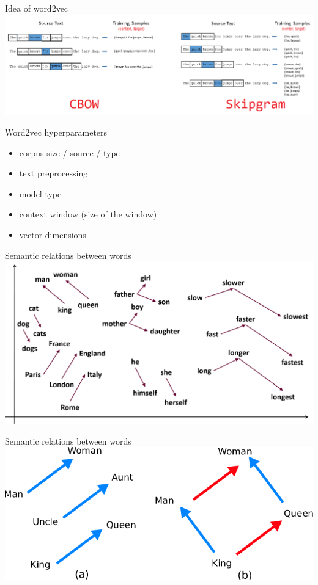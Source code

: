 \documentclass[svgnames]{beamer}
\begin{document}
    \begin{frame}{Idea of word2vec}
        \includegraphics[width=\textwidth]{cbow_sgns2}
    \end{frame}

    \begin{frame}{Word2vec hyperparameters}
        \begin{itemize}
            \item corpus size / source / type
            \item text preprocessing
            \item model type
            \item context window (size of the window)
            \item vector dimensions
        \end{itemize}
    \end{frame}

    \begin{frame}{Semantic relations between words}
        \includegraphics[width=\textwidth]{wvsemantic}
    \end{frame}

    \begin{frame}{Semantic relations between words}
        \includegraphics[width=\textwidth]{wvking}
    \end{frame}
\end{document}
